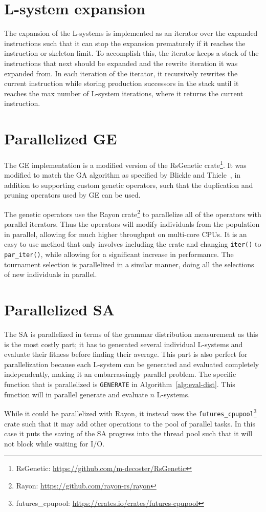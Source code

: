 \section{L-system expansion}
The expansion of the L-systems is implemented as an iterator over the expanded instructions such that it can stop the expansion prematurely if it reaches the instruction or skeleton limit.
To accomplish this, the iterator keeps a stack of the instructions that next should be expanded and the rewrite iteration it was expanded from.
In each iteration of the iterator, it recursively rewrites the current instruction while storing production successors in the stack until it reaches the max number of L-system iterations, where it returns the current instruction.

\section{Parallelized GE}
The GE implementation is a modified version of the RsGenetic crate\footnote{RsGenetic: \url{https://github.com/m-decoster/RsGenetic}}.
It was modified to match the GA algorithm as specified by Blickle and Thiele~\cite{1995Blickle}, in addition to supporting custom genetic operators, such that the duplication and pruning operators used by GE can be used.

The genetic operators use the Rayon crate\footnote{Rayon: \url{https://github.com/rayon-rs/rayon}} to parallelize all of the operators with parallel iterators.
Thus the operators will modify individuals from the population in parallel, allowing for much higher throughput on multi-core CPUs.
It is an easy to use method that only involves including the crate and changing \texttt{iter()} to \texttt{par\_iter()}, while allowing for a significant increase in performance.
The tournament selection is parallelized in a similar manner, doing all the selections of new individuals in parallel.

\section{Parallelized SA}
The SA is parallelized in terms of the grammar distribution measurement as this is the most costly part; it has to generated several individual L-systems and evaluate their fitness before finding their average.
This part is also perfect for parallelization because each L-system can be generated and evaluated completely independently, making it an embarrassingly parallel problem.
The specific function that is parallelized is \texttt{GENERATE} in Algorithm~\ref{alg:eval-dist}.
This function will in parallel generate and evaluate $n$ L-systems.

While it could be parallelized with Rayon, it instead uses the \texttt{futures\_cpupool}\footnote{futures\_cpupool: \url{https://crates.io/crates/futures-cpupool}} crate such that it may add other operations to the pool of parallel tasks.
In this case it puts the saving of the SA progress into the thread pool such that it will not block while waiting for I/O.
